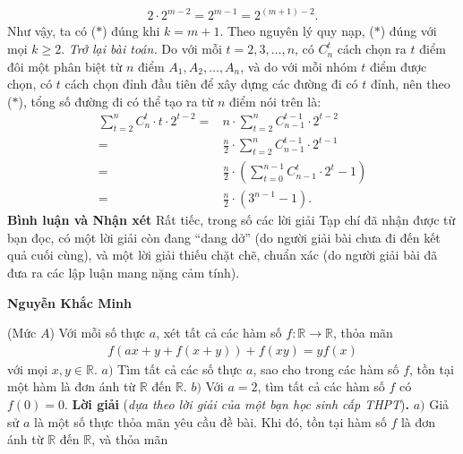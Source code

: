 \begin{multicols}{2}
	\begin{align*}
		2 \cdot {2^{m - 2}} = {2^{m - 1}} = {2^{\left( {m + 1} \right) - 2}}.
	\end{align*}
	Như vậy, ta có ($*$) đúng khi $k = m + 1$.
	\vskip 0.05cm
	Theo nguyên lý quy nạp, ($*$) đúng với mọi $k \ge 2$.
	\vskip 0.05cm
	\textit{Trở lại bài toán.}
	\vskip 0.05cm
	Do với mỗi $t = 2, 3, \ldots, n$, có $C^t_n$  cách chọn ra $t$ điểm đôi một phân biệt từ $n$ điểm  $A_1,  A_2, \ldots,  A_n$, và do với mỗi nhóm $t$ điểm được chọn, có $t$ cách chọn đỉnh đầu tiên để xây dựng các đường đi có $t$ đỉnh, nên theo ($*$), tổng số đường đi có thể tạo ra từ $n$ điểm nói trên là:
	\begin{align*}
		\sum\limits_{t = 2}^n {C_n^t \cdot t \cdot {2^{t - 2}}}  =& n \cdot \sum\limits_{t = 2}^n {C_{n - 1}^{t - 1} \cdot {2^{t - 2}}}  \\
		=& \frac{n}{2} \cdot \sum\limits_{t = 2}^n {C_{n - 1}^{t - 1} \cdot {2^{t - 1}}} \\
		=& \frac{n}{2} \!\cdot\! \left( {\sum\limits_{t = 0}^{n - 1} {C_{n - 1}^t \!\cdot\! {2^t}}  - 1} \!\!\right) \\
		= &\frac{n}{2} \cdot \left( {{3^{n - 1}} - 1} \right).
	\end{align*}
	\textbf{\color{thachthuctoanhoc}Bình luận và Nhận xét}
	\vskip 0.05cm
	Rất tiếc, trong số các lời giải Tạp chí đã nhận được từ bạn đọc, có một lời giải còn đang “dang dở” (do người giải bài chưa đi đến kết quả cuối cùng), và một lời giải thiếu chặt chẽ, chuẩn xác (do người giải bài đã đưa ra các lập luận mang nặng cảm tính).
	\begin{flushright}
		\textbf{\color{thachthuctoanhoc}Nguyễn Khắc Minh}
	\end{flushright}
	{}
	(Mức $A$) Với mỗi số thực $a$, xét tất cả các hàm số $f: \mathbb{R} \to \mathbb{R}$, thỏa mãn
	\begin{align*}
		f\left( {ax + y + f\left( {x + y} \right)} \right) + f\left( {xy} \right) = yf\left( x \right)
	\end{align*}
	với mọi $x, y \in \mathbb{R}$.
	\vskip 0.05cm
	$a)$ Tìm tất cả các số thực $a$, sao cho trong các hàm số $f$, tồn tại một hàm là đơn ánh từ $\mathbb{R}$  đến $\mathbb{R}$.
	\vskip 0.05cm
	$b)$ Với $a = 2$, tìm tất cả các hàm số $f$ có $f(0) = 0$.
	\vskip 0.05cm 
	\textbf{\color{thachthuctoanhoc}Lời giải} (\textit{dựa theo lời giải của một bạn học sinh cấp THPT})\textbf{\color{thachthuctoanhoc}.}
	\vskip 0.05cm
	$a)$ Giả sử $a$ là một số thực thỏa mãn yêu cầu đề bài. Khi đó, tồn tại hàm số $f$ là đơn ánh từ  $\mathbb{R}$ đến  $\mathbb{R}$, và thỏa mãn

\end{multicols}
